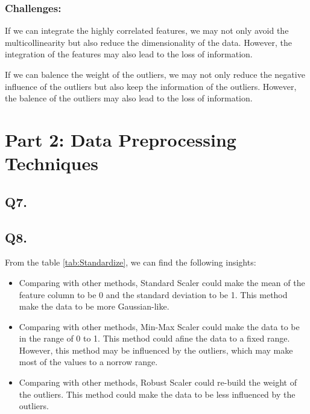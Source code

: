 \documentclass{article}
\begin{document}
\subsubsection*{Challenges:}

If we can integrate the highly correlated features, we may not only avoid the multicollinearity but also reduce the dimensionality of the data. However, the integration of the features may also lead to the loss of information.

If we can balence the weight of the outliers, we may not only reduce the negative influence of the outliers but also keep the information of the outliers. However, the balence of the outliers may also lead to the loss of information.

\newpage

\section*{Part 2:  Data Preprocessing Techniques}

\subsection*{Q7.}

\subsection*{Q8.}

From the table \ref{tab:Standardize}, we can find the following insights:

\begin{itemize}
    \item Comparing with other methods, Standard Scaler could make the mean of the feature column to be 0 and the standard deviation to be 1. This method make the data to be more Gaussian-like.
    \item Comparing with other methods, Min-Max Scaler could make the data to be in the range of 0 to 1. This method could afine the data to a fixed range. However, this method may be influenced by the outliers, which may make most of the values to a norrow range.
    \item Comparing with other methods, Robust Scaler could re-build the weight of the outliers. This method could make the data to be less influenced by the outliers.
\end{itemize}
\end{document}
